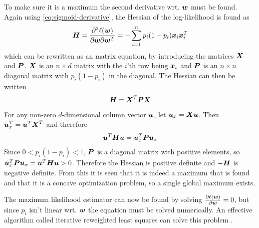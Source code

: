 To make sure it is a maximum the second derivative wrt. $\boldsymbol{w}$ must be found. Again using \eqref{eq:sigmoid-derivative}, the Hessian of the log-likelihood is found as
\begin{align*}
    \boldsymbol{H} = \frac{\partial^2\ell(\boldsymbol{w})}{\partial\boldsymbol{w}\partial\boldsymbol{w}^T} = - \sum_{i=1}^n p_i(1-p_i)\boldsymbol{x}_i\boldsymbol{x}_i^T
\end{align*}
which can be rewritten as an matrix equation, by introducing the matrices $\boldsymbol{X}$ and $\boldsymbol{P}$. $\boldsymbol{X}$ is an $n\times d$ matrix with the $i$'th row being $\boldsymbol{x}_i$ and $\boldsymbol{P}$ is an $n\times n$ diagonal matrix with $p_i(1-p_i)$ in the diagonal. The Hessian can then be written
\[
    \boldsymbol{H} = \boldsymbol{X}^T\boldsymbol{P}\boldsymbol{X}
\]
For any non-zero $d$-dimensional column vector $\boldsymbol{u}$, let $\boldsymbol{u}_x = \boldsymbol{X}\boldsymbol{u}$. Then $\boldsymbol{u}_x^T = \boldsymbol{u}^T\boldsymbol{X}^T$ and therefore
\begin{align*}
    \boldsymbol{u}^T\boldsymbol{H}\boldsymbol{u} = \boldsymbol{u}_x^T\boldsymbol{P}\boldsymbol{u}_x
\end{align*}
Since $0<p_i(1-p_i)<1$, $\boldsymbol{P}$ is a diagonal matrix with positive elements, so $\boldsymbol{u}_x^T\boldsymbol{P}\boldsymbol{u}_x=\boldsymbol{u}^T\boldsymbol{H}\boldsymbol{u}>0$. Therefore the Hessian is  positive definite and $-\boldsymbol{H}$ is negative definite. From this it is seen that it is indeed a maximum that is found and that it is a concave optimization problem, so a single global maximum exists. \par
The maximum likelihood estimator can now be found by solving $\frac{\partial\ell(\boldsymbol{w})}{\partial\boldsymbol{w}}=0$, but since $p_i$ isn't linear wrt. $\boldsymbol{w}$ the equation must be solved numerically. An effective algorithm called iterative reweighted least squares can solve this problem \citep[p.207]{bishop}.


